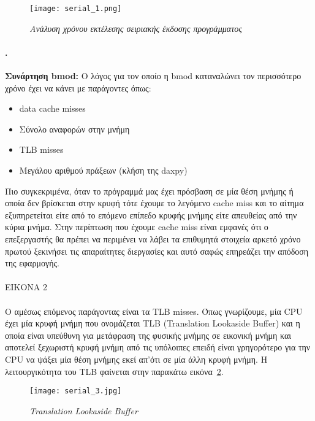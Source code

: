 \documentclass[greek,booktabs,8pt,flagBlueCMYK]{report}
\begin{document}
\begin{figure}[ht]
\centering
\texttt{[image: serial\_1.png]}
\caption{\textit{Ανάλυση χρόνου εκτέλεσης σειριακής έκδοσης προγράμματος}}
\label{fig:serial_1}
\end{figure}

\clearpage
\paragraph{.} \textbf{Συνάρτηση bmod:}\newline
Ο λόγος για τον οποίο η bmod καταναλώνει τον περισσότερο χρόνο έχει να κάνει με παράγοντες όπως:
\begin{itemize}
  \item data cache misses
  \item Σύνολο αναφορών στην μνήμη
  \item TLB misses
  \item Μεγάλου αριθμού πράξεων (κλήση της daxpy)
\end{itemize}
Πιο συγκεκριμένα, όταν το πρόγραμμά μας έχει πρόσβαση σε μία θέση μνήμης ή οποία δεν βρίσκεται στην κρυφή τότε έχουμε το λεγόμενο cache miss και το αίτημα εξυπηρετείται είτε από το επόμενο επίπεδο κρυφής μνήμης είτε απευθείας από την κύρια μνήμα. Στην περίπτωση που έχουμε cache miss είναι εμφανές ότι ο επεξεργαστής θα πρέπει να περιμένει να λάβει τα επιθυμητά στοιχεία αρκετό χρόνο πρωτού ξεκινήσει τις απαραίτητες διεργασίες και αυτό σαφώς επηρεάζει την απόδοση της εφαρμογής.
\\ \\
EIKONA 2
\\ \\
Ο αμέσως επόμενος παράγοντας είναι τα TLB misses.  Όπως γνωρίζουμε, μία CPU έχει μία κρυφή μνήμη που ονομάζεται TLB (Translation Lookaside Buffer) και η οποία είναι υπεύθυνη για μετάφραση της φυσικής μνήμης σε εικονική μνήμη και αποτελεί ξεχωριστή κρυφή μνήμη από τις υπόλοιπες επειδή είναι γρηγορότερο για την CPU να ψάξει μία θέση μνήμης εκεί απ’ότι σε μία άλλη κρυφή μνήμη. Η λειτουργικότητα του TLB φαίνεται στην παρακάτω 
εικόνα~\ref{fig:serial_3}. 

\begin{figure}[ht]
\centering
\texttt{[image: serial\_3.jpg]}
\caption{\textit{Translation Lookaside Buffer}}
\label{fig:serial_3}
\end{figure}
\end{document}
